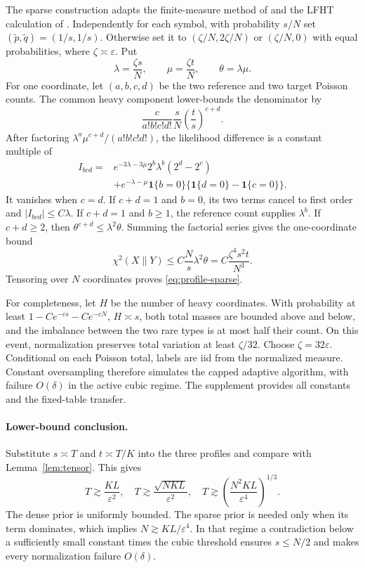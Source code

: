 \documentclass[twoside]{article}
\newcommand{\one}{\mathbf 1}
\begin{document}
The sparse construction adapts the finite-measure method of \citet{diakonikolas2021highprob} and the LFHT calculation of \citet{gerber2023classification}. Independently for each symbol, with probability $s/N$ set $(\tilde p,\tilde q)=(1/s,1/s)$. Otherwise set it to $(\zeta/N,2\zeta/N)$ or $(\zeta/N,0)$ with equal probabilities, where $\zeta\asymp\varepsilon$. Put
\[
\lambda=\frac{\zeta s}{N},\qquad
\mu=\frac{\zeta t}{N},\qquad
\theta=\lambda\mu.
\]
For one coordinate, let $(a,b,c,d)$ be the two reference and two target Poisson counts. The common heavy component lower-bounds the denominator by
\[
\frac{c}{a!b!c!d!}\frac{s}{N}\left(\frac ts\right)^{c+d}.
\]
After factoring $\lambda^a\mu^{c+d}/(a!b!c!d!)$, the likelihood difference is a constant multiple of
\begin{align*}
I_{bcd}={}&e^{-3\lambda-3\mu}2^b\lambda^b(2^d-2^c)\\
&+e^{-\lambda-\mu}\one\{b=0\}
\{\one\{d=0\}-\one\{c=0\}\}.
\end{align*}
It vanishes when $c=d$. If $c+d=1$ and $b=0$, its two terms cancel to first order and $|I_{bcd}|\leq C\lambda$. If $c+d=1$ and $b\geq1$, the reference count supplies $\lambda^b$. If $c+d\geq2$, then $\theta^{c+d}\leq\lambda^2\theta$. Summing the factorial series gives the one-coordinate bound
\[
\chi^2(X\|Y)\leq C\frac Ns\lambda^2\theta
=C\frac{\zeta^4s^2t}{N^3}.
\]
Tensoring over $N$ coordinates proves \eqref{eq:profile-sparse}.

For completeness, let $H$ be the number of heavy coordinates. With probability at least $1-Ce^{-cs}-Ce^{-cN}$, $H\asymp s$, both total masses are bounded above and below, and the imbalance between the two rare types is at most half their count. On this event, normalization preserves total variation at least $\zeta/32$. Choose $\zeta=32\varepsilon$. Conditional on each Poisson total, labels are iid from the normalized measure. Constant oversampling therefore simulates the capped adaptive algorithm, with failure $O(\delta)$ in the active cubic regime. The supplement provides all constants and the fixed-table transfer.

\paragraph{Lower-bound conclusion.} Substitute $s\asymp T$ and $t\asymp T/K$ into the three profiles and compare with Lemma~\ref{lem:tensor}. This gives
\[
T\gtrsim \frac{KL}{\varepsilon^2},\quad
T\gtrsim\frac{\sqrt{NKL}}{\varepsilon^2},\quad
T\gtrsim\left(\frac{N^2KL}{\varepsilon^4}\right)^{1/3}.
\]
The dense prior is uniformly bounded. The sparse prior is needed only when its term dominates, which implies $N\gtrsim KL/\varepsilon^4$. In that regime a contradiction below a sufficiently small constant times the cubic threshold ensures $s\leq N/2$ and makes every normalization failure $O(\delta)$.
\end{document}
